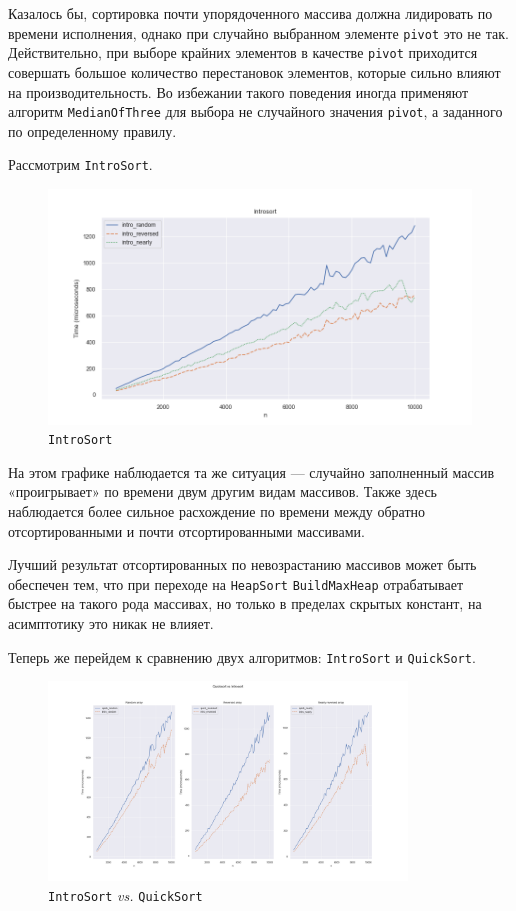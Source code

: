 \documentclass[11pt,a4paper]{scrarticle}
\theoremstyle{definition}
\begin{document}
Казалось бы, сортировка почти упорядоченного массива должна лидировать по времени исполнения, однако при случайно выбранном элементе \texttt{pivot} это не так. Действительно, при выборе крайних элементов в качестве \texttt{pivot} приходится совершать большое количество перестановок элементов, которые сильно влияют на производительность. Во избежании такого поведения иногда применяют алгоритм \texttt{MedianOfThree} для выбора не случайного значения \texttt{pivot}, а заданного по определенному правилу.

Рассмотрим \texttt{IntroSort}.

\begin{figure}[htp]
	\centering
	\includegraphics[width=\textwidth]{../static/intro.png}
	\caption{\texttt{IntroSort}}
	\label{fig:quick}
\end{figure}
\FloatBarrier

На этом графике наблюдается та же ситуация --- случайно заполненный массив «проигрывает» по времени двум другим видам массивов. Также здесь наблюдается более сильное расхождение по времени между обратно отсортированными и почти отсортированными массивами.

Лучший результат отсортированных по невозрастанию массивов может быть обеспечен тем, что при переходе на \texttt{HeapSort} \texttt{BuildMaxHeap} отрабатывает быстрее на такого рода массивах, но только в пределах скрытых констант, на асимптотику это никак не влияет.\pagebreak

Теперь же перейдем к сравнению двух алгоритмов: \texttt{IntroSort} и \texttt{QuickSort}.

\begin{figure}[htp]
	\centering
	\includegraphics[width=0.85\textwidth]{../static/array_types.png}
	\caption{\texttt{IntroSort} \emph{vs.} \texttt{QuickSort}}
	\label{fig:types}
\end{figure}
\FloatBarrier
\end{document}
